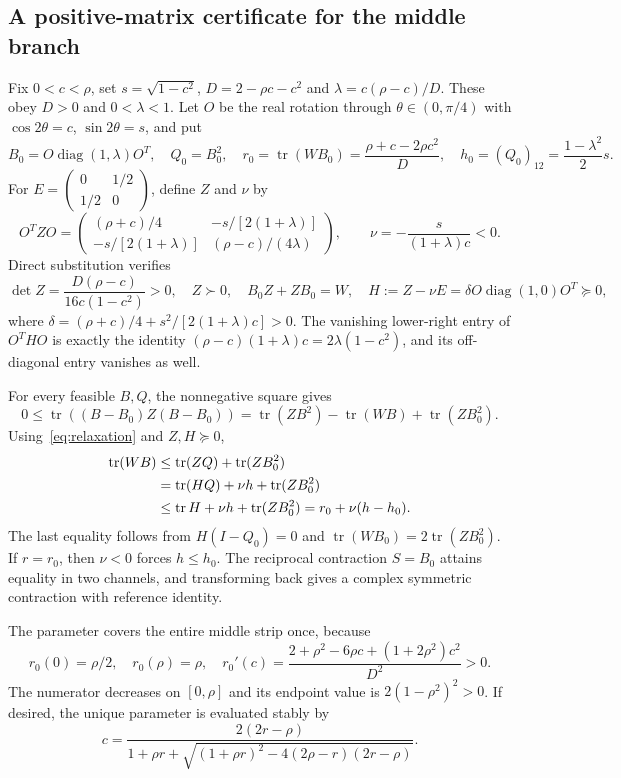 \documentclass[11pt,a4paper]{article}
\theoremstyle{remark}
\newcommand{\tr}{\operatorname{tr}}
\newcommand{\diag}{\operatorname{diag}}
\begin{document}
\subsection{A positive-matrix certificate for the middle branch}
Fix $0<c<\rho$, set $s=\sqrt{1-c^2}$, $D=2-\rho c-c^2$ and $\lambda=c(\rho-c)/D$. These obey $D>0$ and $0<\lambda<1$. Let $O$ be the real rotation through $\theta\in(0,\pi/4)$ with $\cos2\theta=c$, $\sin2\theta=s$, and put
\[
 B_0=O\diag(1,\lambda)O^T,\quad Q_0=B_0^2,\quad
 r_0=\tr(WB_0)=\frac{\rho+c-2\rho c^2}{D},\quad
 h_0=(Q_0)_{12}=\frac{1-\lambda^2}{2}s.
\]
For $E=\left(\begin{smallmatrix}0&1/2\\1/2&0\end{smallmatrix}\right)$, define $Z$ and $\nu$ by
\begin{equation}\label{eq:certificate}
 O^TZO=\begin{pmatrix}(\rho+c)/4&-s/[2(1+\lambda)]\\-s/[2(1+\lambda)]&(\rho-c)/(4\lambda)\end{pmatrix},
 \qquad \nu=-\frac{s}{(1+\lambda)c}<0.
\end{equation}
Direct substitution verifies
\begin{equation}\label{eq:certificate-identities}
 \det Z=\frac{D(\rho-c)}{16c(1-c^2)}>0,\quad Z\succ0,\quad
 B_0Z+ZB_0=W,\quad
 H:=Z-\nu E=\delta O\diag(1,0)O^T\succeq0,
\end{equation}
where $\delta=(\rho+c)/4+s^2/[2(1+\lambda)c]>0$. The vanishing lower-right entry of $O^THO$ is exactly the identity $(\rho-c)(1+\lambda)c=2\lambda(1-c^2)$, and its off-diagonal entry vanishes as well.

For every feasible $B,Q$, the nonnegative square gives
\[
 0\leq\tr((B-B_0)Z(B-B_0))
 =\tr(ZB^2)-\tr(WB)+\tr(ZB_0^2).
\]
Using~\eqref{eq:relaxation} and $Z,H\succeq0$,
\begin{align}\label{eq:dual-bound}
 \tr(WB)&\leq\tr(ZQ)+\tr(ZB_0^2)\notag\\
 &=\tr(HQ)+\nu h+\tr(ZB_0^2)\notag\\
 &\leq\tr H+\nu h+\tr(ZB_0^2)=r_0+\nu(h-h_0).
\end{align}
The last equality follows from $H(I-Q_0)=0$ and $\tr(WB_0)=2\tr(ZB_0^2)$. If $r=r_0$, then $\nu<0$ forces $h\leq h_0$. The reciprocal contraction $\widehat S=B_0$ attains equality in two channels, and transforming back gives a complex symmetric contraction with reference identity.

The parameter covers the entire middle strip once, because
\[
 r_0(0)=\rho/2,\quad r_0(\rho)=\rho,\quad
 r_0'(c)=\frac{2+\rho^2-6\rho c+(1+2\rho^2)c^2}{D^2}>0.
\]
The numerator decreases on $[0,\rho]$ and its endpoint value is $2(1-\rho^2)^2>0$. If desired, the unique parameter is evaluated stably by
\[
 c=\frac{2(2r-\rho)}{1+\rho r+\sqrt{(1+\rho r)^2-4(2\rho-r)(2r-\rho)}}.
\]
\end{document}
